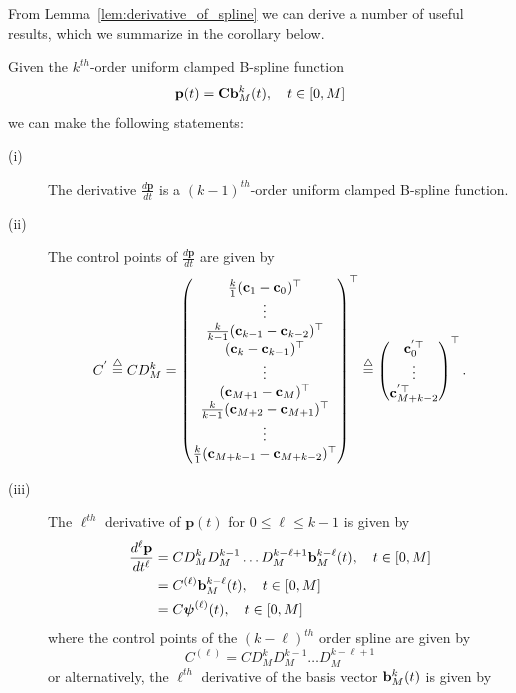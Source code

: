 From Lemma~\ref{lem:derivative_of_spline} we can derive a number of useful results, which we summarize in the corollary below.
\begin{corollary}
	Given the $k^{th}$-order uniform clamped B-spline function
	\[
	\mathbf{p}(t) = \mathbf{C} \mathbf{b}_M^k(t), \quad t\in[0, M]
	\]
	we can make the following statements:
	\begin{description}
	\item[(i)] The derivative  $\frac{d\mathbf{p}}{dt}$ is a $(k-1)^{th}$-order uniform clamped B-spline function.
	\item[(ii)] The control points of $\frac{d\mathbf{p}}{dt}$ are given by
		\[
		C^{'} \stackrel{\triangle}{=} C D_M^k = \begin{pmatrix}
				\frac{k}{1} (\mathbf{c}_1 - \mathbf{c}_0)^\top \\
				\vdots \\
				\frac{k}{k-1} (\mathbf{c}_{k-1} - \mathbf{c}_{k-2})^\top \\
				(\mathbf{c}_k - \mathbf{c}_{k-1})^\top \\
				\vdots \\
				(\mathbf{c}_{M+1} - \mathbf{c}_{M})^\top \\
				\frac{k}{k-1} (\mathbf{c}_{M+2}-\mathbf{c}_{M+1})^\top \\
				\vdots \\
				\frac{k}{1} (\mathbf{c}_{M+k-1} - \mathbf{c}_{M+k-2})^\top
 				\end{pmatrix}^\top
 			\stackrel{\triangle}{=} \begin{pmatrix}
 			        \mathbf{c}_0^{'\top} \\
 			        \vdots \\
 			        \mathbf{c}_{M+k-2}^{'\top}
 				   \end{pmatrix}^\top.
		\]
	\item[(iii)] The $\ell^{th}$ derivative of $\mathbf{p}(t)$ for $0\leq\ell\leq k-1$ is given by
		\begin{align*}
			\frac{d^{\ell}\mathbf{p}}{dt^{\ell}} 
			&= C D_M^k D_M^{k-1} \dots D_M^{k-\ell+1} \mathbf{b}_M^{k-\ell}(t), \quad t\in [0, M] \\
			&= C^{(\ell)} \mathbf{b}_M^{k-\ell}(t), \quad t\in [0, M] \\
			&= C \boldsymbol{\psi}^{(\ell)}(t), \quad t\in [0, M] \\
		\end{align*}
		where the control points of the $(k-\ell)^{th}$ order spline are given by
		\[
			C^{(\ell)} = C D_M^k D_M^{k-1} \dots D_M^{k-\ell+1}
		\]
		or alternatively, the $\ell^{th}$ derivative of the basis vector $\mathbf{b}_M^k(t)$ is given by
		\[
\]
\end{description}
\end{corollary}
